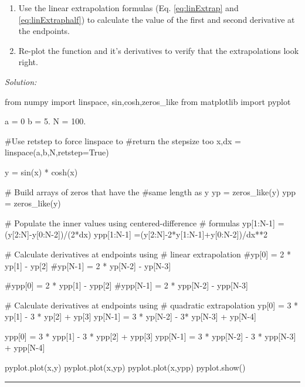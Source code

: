 \begin{enumerate}
\probtwo 
\begin{enumerate}
\item Use the linear extrapolation formulas (Eq. \eqref{eq:linExtrap} and
\eqref{eq:linExtraphalf}) to calculate the value of the first and second derivative at
the endpoints.
\item  Re-plot the function and it's derivatives to verify that the
  extrapolations look right.
\end{enumerate}
\end{enumerate}
\ifsolutions
\textit{Solution:}\\
\begin{codeexample}
\begin{VerbatimOut}{\listingFile}
from numpy import linspace, sin,cosh,zeros_like
from matplotlib import pyplot

a = 0
b = 5.
N = 100.

#Use retstep to force linspace to
#return the stepsize too
x,dx = linspace(a,b,N,retstep=True)


y = sin(x) * cosh(x)

# Build arrays of zeros that have the 
#same length as y
yp = zeros_like(y)
ypp = zeros_like(y)

# Populate the inner values using centered-difference
# formulas
yp[1:N-1] =(y[2:N]-y[0:N-2])/(2*dx)
ypp[1:N-1] =(y[2:N]-2*y[1:N-1]+y[0:N-2])/dx**2

# Calculate derivatives at endpoints using 
# linear extrapolation
#yp[0] = 2 * yp[1] - yp[2]
#yp[N-1] = 2 * yp[N-2] - yp[N-3]

#ypp[0] = 2 * ypp[1] - ypp[2]
#ypp[N-1] = 2 * ypp[N-2] - ypp[N-3]

# Calculate derivatives at endpoints using 
# quadratic extrapolation
yp[0] = 3 * yp[1] - 3 * yp[2] + yp[3]
yp[N-1] = 3 * yp[N-2] - 3* yp[N-3] + yp[N-4]

ypp[0] = 3 * ypp[1] - 3 * ypp[2] + ypp[3]
ypp[N-1] = 3 * ypp[N-2] - 3 * ypp[N-3] + ypp[N-4]


pyplot.plot(x,y)
pyplot.plot(x,yp)
pyplot.plot(x,ypp)
pyplot.show()
\end{VerbatimOut}
\end{codeexample}
\else
\noindent\rule{5 in}{0.01 in}
\fi


